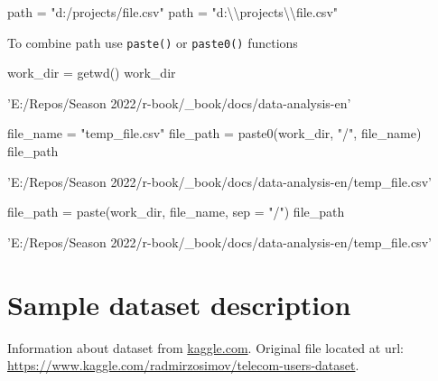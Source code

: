 \documentclass[
  letterpaper,
  DIV=11,
  numbers=noendperiod]{scrreprt}
\newenvironment{Shaded}{\begin{snugshade}}{\end{snugshade}}
\newcommand{\AttributeTok}[1]{\textcolor[rgb]{0.40,0.45,0.13}{#1}}
\newcommand{\FunctionTok}[1]{\textcolor[rgb]{0.28,0.35,0.67}{#1}}
\newcommand{\NormalTok}[1]{\textcolor[rgb]{0.00,0.23,0.31}{#1}}
\newcommand{\OtherTok}[1]{\textcolor[rgb]{0.00,0.23,0.31}{#1}}
\newcommand{\SpecialCharTok}[1]{\textcolor[rgb]{0.37,0.37,0.37}{#1}}
\newcommand{\StringTok}[1]{\textcolor[rgb]{0.13,0.47,0.30}{#1}}
\begin{document}
\begin{Shaded}
\begin{Highlighting}[]
\NormalTok{path }\OtherTok{=} \StringTok{"d:/projects/file.csv"}
\NormalTok{path }\OtherTok{=} \StringTok{"d:}\SpecialCharTok{\textbackslash{}\textbackslash{}}\StringTok{projects}\SpecialCharTok{\textbackslash{}\textbackslash{}}\StringTok{file.csv"}
\end{Highlighting}
\end{Shaded}

To combine path use \texttt{paste()} or \texttt{paste0()} functions

\begin{Shaded}
\begin{Highlighting}[]
\NormalTok{work\_dir }\OtherTok{=} \FunctionTok{getwd}\NormalTok{()}
\NormalTok{work\_dir }
\end{Highlighting}
\end{Shaded}

'E:/Repos/Season 2022/r-book/\_book/docs/data-analysis-en'

\begin{Shaded}
\begin{Highlighting}[]
\NormalTok{file\_name }\OtherTok{=} \StringTok{"temp\_file.csv"}
\NormalTok{file\_path }\OtherTok{=} \FunctionTok{paste0}\NormalTok{(work\_dir, }\StringTok{"/"}\NormalTok{, file\_name)}
\NormalTok{file\_path}
\end{Highlighting}
\end{Shaded}

'E:/Repos/Season
2022/r-book/\_book/docs/data-analysis-en/temp\_file.csv'

\begin{Shaded}
\begin{Highlighting}[]
\NormalTok{file\_path }\OtherTok{=} \FunctionTok{paste}\NormalTok{(work\_dir, file\_name, }\AttributeTok{sep =} \StringTok{"/"}\NormalTok{)}
\NormalTok{file\_path}
\end{Highlighting}
\end{Shaded}

'E:/Repos/Season
2022/r-book/\_book/docs/data-analysis-en/temp\_file.csv'

\section{Sample dataset description}\label{sample-dataset-description}

Information about dataset from \url{kaggle.com}. Original file located
at url:
\url{https://www.kaggle.com/radmirzosimov/telecom-users-dataset}.
\end{document}
